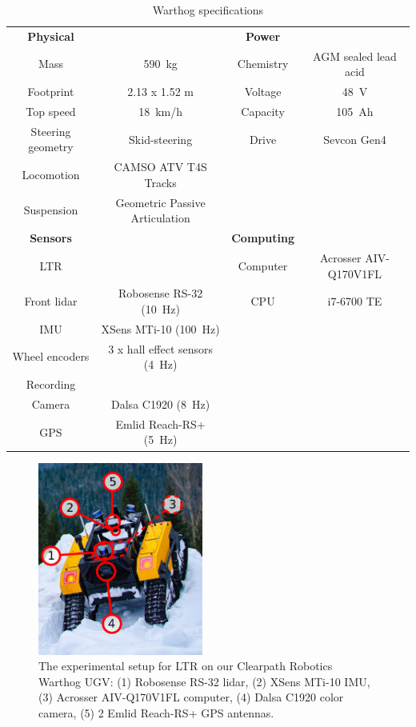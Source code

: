 \begin{table}[htpb]
	\caption{Warthog specifications} \label{tab:warthog_specs}
	\begin{center}
		\begin{tabular}{c c | c c}
			\textbf{Physical} &  & \textbf{Power} & \\
			Mass & \SI{590}{kg} & Chemistry & AGM sealed lead acid \\ 
			Footprint & 2.13 x 1.52 m & Voltage & \SI{48}{V} \\ 
			Top speed & \SI{18}{km/h} & Capacity & \SI{105}{Ah} \\ 
			Steering geometry & Skid-steering  & Drive & Sevcon Gen4 \\
			Locomotion & CAMSO ATV T4S Tracks \\
			Suspension & Geometric Passive Articulation \\
			\hline
			\textbf{Sensors} & & \textbf{Computing} \\
			\ac{LTR} & & Computer & Acrosser AIV-Q170V1FL  \\
			Front lidar & Robosense RS-32 (\SI{10}{Hz}) & CPU & i7-6700 TE \\
			\ac{IMU} & XSens MTi-10 (\SI{100}{Hz}) \\ 
			Wheel encoders & 3 x hall effect sensors (\SI{4}{Hz}) \\
			Recording & &   \\
			Camera & Dalsa C1920 (\SI{8}{Hz})  \\
			\ac{GPS} & Emlid Reach-RS+ (\SI{5}{Hz}) \\
		\end{tabular}
	\end{center}
\end{table}

\begin{figure}
	\centering
	\includegraphics[height=2.5in]{figs/warthog_hardware.pdf}
	\caption{The experimental setup for \ac{LTR} on our Clearpath Robotics Warthog \ac{UGV}: (1) Robosense RS-32 lidar, (2) XSens MTi-10 \ac{IMU}, (3) Acrosser AIV-Q170V1FL computer, (4) Dalsa C1920 color camera, (5) 2 Emlid Reach-RS+ \ac{GPS} antennas.}
	\label{fig:warthog}
\end{figure}
